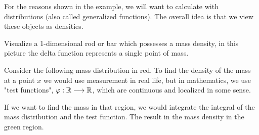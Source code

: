 \documentclass[11pt, openright]{book}
\begin{document}
For the reasons shown in the example, we will want to calculate with distributions (also called generalized functions). The overall idea is that we view these objects as densities.

\begin{example}
    Visualize a 1-dimensional rod or bar which possesses a mass density, in this picture the delta function represents a single point of mass.

    \begin{minipage}{\textwidth}
        \begin{wrapfigure}{l}{4cm}
            \centering
            \vspace{-0.7cm}
        \end{wrapfigure}
        Consider the following mass distribution in red. To find the density of the mass at a point $x$ we would use measurement in real life, but in mathematics, we use "test functions", $\varphi: \mathbb{R} \longrightarrow \mathbb{R} $, which are continuous and localized in some sense.\vspace{10pt}

        If we want to find the mass in that region, we would integrate the integral of the mass distribution and the test function. The result in the mass density in the green region.
    \end{minipage}


\end{example}
\end{document}
